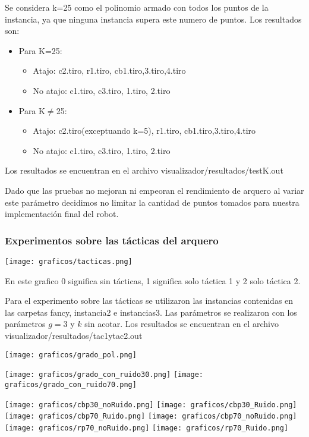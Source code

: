 Se considera k=25 como el polinomio armado con todos los puntos de la
instancia, ya que ninguna instancia supera este numero de puntos.  Los
resultados son:

\begin{itemize}
\item Para K=25:
  \begin{itemize}
    \item Atajo: c2.tiro, r1.tiro, cb1.tiro,3.tiro,4.tiro
    \item No atajo: c1.tiro, c3.tiro, 1.tiro, 2.tiro
  \end{itemize}
\item Para K$\neq$25:
  \begin{itemize}
    \item Atajo: c2.tiro(exceptuando k=5), r1.tiro, cb1.tiro,3.tiro,4.tiro
    \item No atajo: c1.tiro, c3.tiro, 1.tiro, 2.tiro
  \end{itemize}
\end{itemize}

Los resultados se encuentran en el archivo visualizador/resultados/testK.out

Dado que las pruebas no mejoran ni empeoran el rendimiento de arquero al variar
este parámetro decidimos no limitar la cantidad de puntos tomados para nuestra
implementación final del robot.

\subsubsection*{Experimentos sobre las tácticas del arquero}

\texttt{[image: graficos/tacticas.png]}

En este grafico 0 significa sin tácticas, 1 significa solo táctica 1 y
2 solo táctica 2.

Para el experimento sobre las tácticas se utilizaron las instancias contenidas
en las carpetas fancy, instancia2 e instancias3.  Las parámetros se realizaron
con los parámetros $g=3$ y $k$ sin acotar.  Los resultados se encuentran en el
archivo visualizador/resultados/tac1ytac2.out


\texttt{[image: graficos/grado\_pol.png]}

\texttt{[image: graficos/grado\_con\_ruido30.png]}
\texttt{[image: graficos/grado\_con\_ruido70.png]}

\texttt{[image: graficos/cbp30\_noRuido.png]}
\texttt{[image: graficos/cbp30\_Ruido.png]}
\texttt{[image: graficos/cbp70\_Ruido.png]}
\texttt{[image: graficos/cbp70\_noRuido.png]}
\texttt{[image: graficos/rp70\_noRuido.png]}
\texttt{[image: graficos/rp70\_Ruido.png]}

